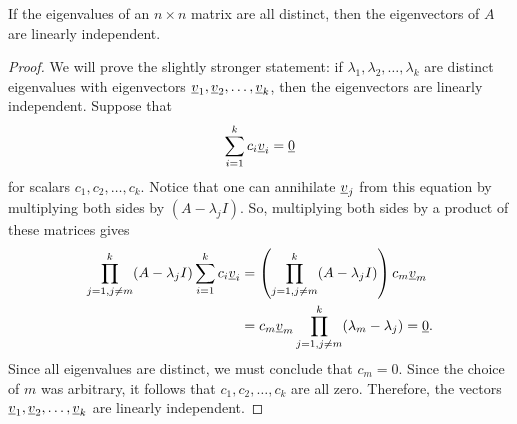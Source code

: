 \begin{theorem}
If the eigenvalues of an $n \times n$ matrix are all distinct, then the eigenvectors of $A$ are linearly independent.
\end{theorem}
\begin{proof}
We will prove the slightly stronger statement: if $\lambda_1 , \lambda_2 , \ldots, \lambda_k $ are distinct eigenvalues with eigenvectors $\underline{v}_1 , \underline{v}_2 , \ldots, \underline{v}_k$, then the eigenvectors are linearly independent.
Suppose that
\begin{equation*}
\sum_{i=1}^k c_i \underline{v}_i = \underline{0}
\end{equation*}
for scalars $c_1, c_2, \ldots, c_k$.
Notice that one can annihilate $\underline{v}_j$ from this equation by multiplying both sides by $(A-\lambda_j I)$.
So, multiplying both sides by a product of these matrices gives
\begin{align*}
\prod_{j=1,j\neq m}^k (A-\lambda_j I) \sum_{i=1}^k c_i \underline{v}_i
&= \left( \prod_{j=1,j\neq m}^k (A-\lambda_j I) \right) c_m \underline{v}_m \\
&= c_m \underline{v}_m \prod_{j=1,j\neq m}^k (\lambda_m - \lambda_j) = \underline{0}.
\end{align*}
Since all eigenvalues are distinct, we must conclude that $c_m = 0$.
Since the choice of $m$ was arbitrary, it follows that $c_1,c_2,\ldots,c_k$ are all zero.
Therefore, the vectors $\underline{v}_1 , \underline{v}_2 , \ldots, \underline{v}_k$ are linearly independent.
\end{proof}

